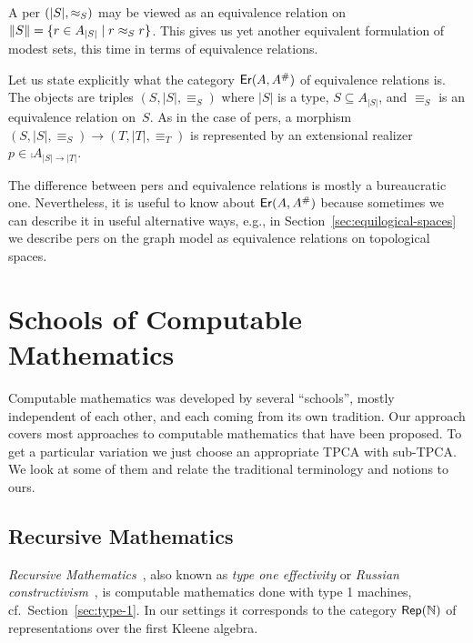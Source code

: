 A per $(|S|, {\approx_S})$ may be viewed as an equivalence relation on
$\|S\| = \{r \in A_{|S|} \mid r \approx_S r\}$. This gives us yet
another equivalent formulation of modest sets, this time in terms of
equivalence relations.

Let us state explicitly what the category $\mathsf{Er}(A, A^{\#})$ of
equivalence relations is. The objects are triples $(S, |S|,
{\equiv_S})$ where $|S|$ is a type, $S \subseteq A_{|S|}$, and
$\equiv_S$ is an equivalence relation on~$S$. As in the case of pers,
a morphism $(S, |S|, {\equiv_S}) \to (T, |T|, {\equiv_T})$ is
represented by an extensional realizer $p \in \comp{A}_{|S| \to |T|}$.

The difference between pers and equivalence relations is mostly a
bureaucratic one. Nevertheless, it is useful to know about $\mathsf{Er}(A,
  A^{\#})$ because sometimes we can describe it in useful
alternative ways, e.g., in Section~\ref{sec:equilogical-spaces} we
describe pers on the graph model as equivalence relations on
topological spaces.


\section{Schools of Computable Mathematics}
\label{sec:schools}

Computable mathematics was developed by several ``schools'', mostly
independent of each other, and each coming from its own tradition. Our
approach covers most approaches to computable mathematics that have
been proposed. To get a particular variation we just choose an
appropriate TPCA with sub-TPCA. We look at some of them and relate the
traditional terminology and notions to ours.

\subsection{Recursive Mathematics}
\label{sec:recursive-math}

\emph{Recursive Mathematics}~\cite{type-1}, also known as \emph{type
  one effectivity} or \emph{Russian constructivism}~\cite{russ}, is
computable mathematics done with type 1 machines, cf.\
Section~\ref{sec:type-1}. In our settings it corresponds to the
category $\mathsf{Rep}(\mathbb{N})$ of representations over the first Kleene algebra.

